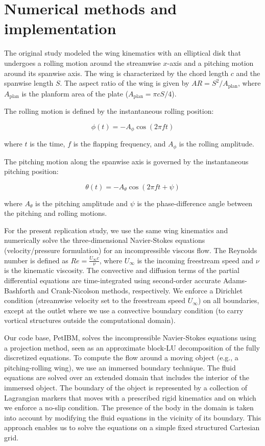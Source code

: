 \section{Numerical methods and implementation}

The original study modeled the wing kinematics with an elliptical disk that undergoes a rolling motion around the streamwise $x$-axis and a pitching motion around its spanwise axis.
The wing is characterized by the chord length $c$ and the spanwise length $S$.
The aspect ratio of the wing is given by $AR = S^2 / A_\text{plan}$, where $A_\text{plan}$ is the planform area of the plate ($A_\text{plan} = \pi c S / 4$).

The rolling motion is defined by the instantaneous rolling position:

\begin{equation}
  \phi (t) = -A_\phi \cos \left( 2 \pi f t \right)
\end{equation}

where $t$ is the time, $f$ is the flapping frequency, and $A_\phi$ is the rolling amplitude.

The pitching motion along the spanwise axis is governed by the instantaneous pitching position:

\begin{equation}
  \theta (t) = -A_\theta \cos(2 \pi f t + \psi)
\end{equation}

where $A_\theta$ is the pitching amplitude and $\psi$ is the phase-difference angle between the pitching and rolling motions.

For the present replication study, we use the same wing kinematics and numerically solve the three-dimensional Navier-Stokes equations (velocity/pressure formulation) for an incompressible viscous flow.
The Reynolds number is defined as $Re = \frac{U_\infty c}{\nu}$, where $U_\infty$ is the incoming freestream speed and $\nu$ is the kinematic viscosity.
The convective and diffusion terms of the partial differential equations are time-integrated using second-order accurate Adams-Bashforth and Crank-Nicolson methods, respectively.
We enforce a Dirichlet condition (streamwise velocity set to the freestream speed $U_\infty$) on all boundaries, except at the outlet where we use a convective boundary condition (to carry vortical structures outside the computational domain).

Our code base, PetIBM, solves the incompressible Navier-Stokes equations using a projection method, seen as an approximate block-LU decomposition of the fully discretized equations.\supercite{perot_1993}
To compute the flow around a moving object (e.g., a pitching-rolling wing), we use an immersed boundary technique.
The fluid equations are solved over an extended domain that includes the interior of the immersed object.
The boundary of the object is represented by a collection of Lagrangian markers that moves with a prescribed rigid kinematics and on which we enforce a no-slip condition.
The presence of the body in the domain is taken into account by modifying the fluid equations in the vicinity of its boundary.
This approach enables us to solve the equations on a simple fixed structured Cartesian grid.

